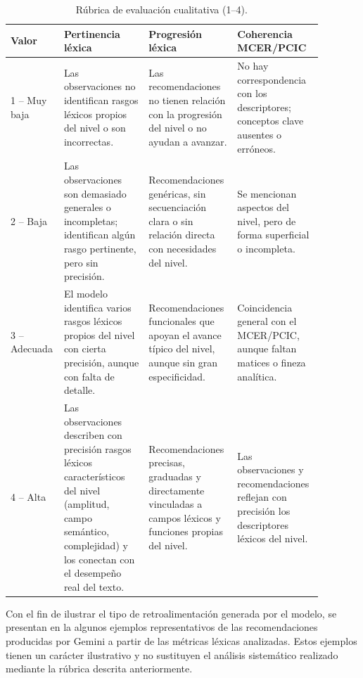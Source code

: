 \documentclass[spanish]{textolivre}
\begin{document}
\begin{table}[h]
    \caption{Rúbrica de evaluación cualitativa (1–4).}
    \label{tab3}
    \centering
    \begin{tabular}
    {p{0.10\linewidth} p{0.26\linewidth} p{0.26\linewidth} p{0.26\linewidth}}
        \toprule
        Valor & Pertinencia léxica & Progresión léxica & Coherencia MCER/PCIC \\
        \midrule
        1 -- Muy baja &
        Las observaciones no identifican rasgos léxicos propios del nivel o son incorrectas. &
        Las recomendaciones no tienen relación con la progresión del nivel o no ayudan a avanzar. &
        No hay correspondencia con los descriptores; conceptos clave ausentes o erróneos. \\
        2 -- Baja &
        Las observaciones son demasiado generales o incompletas; identifican algún rasgo pertinente, pero sin precisión. &
        Recomendaciones genéricas, sin secuenciación clara o sin relación directa con necesidades del nivel. &
        Se mencionan aspectos del nivel, pero de forma superficial o incompleta. \\
        3 -- Adecuada &
        El modelo identifica varios rasgos léxicos propios del nivel con cierta precisión, aunque con falta de detalle. &
        Recomendaciones funcionales que apoyan el avance típico del nivel, aunque sin gran especificidad. &
        Coincidencia general con el MCER/PCIC, aunque faltan matices o fineza analítica. \\
        4 -- Alta &
        Las observaciones describen con precisión rasgos léxicos característicos del nivel (amplitud, campo semántico, complejidad) y los conectan con el desempeño real del texto. &
        Recomendaciones precisas, graduadas y directamente vinculadas a campos léxicos y funciones propias del nivel. &
        Las observaciones y recomendaciones reflejan con precisión los descriptores léxicos del nivel. \\
        \bottomrule
    \end{tabular}
\end{table}


Con el fin de ilustrar el tipo de retroalimentación generada por el modelo, se presentan en la  algunos ejemplos representativos de las recomendaciones producidas por Gemini a partir de las métricas léxicas analizadas. Estos ejemplos tienen un carácter ilustrativo y no sustituyen el análisis sistemático realizado mediante la rúbrica descrita anteriormente.
\end{document}
